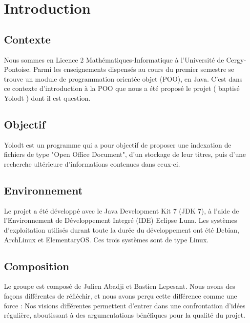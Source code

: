 \section{Introduction} %

\subsection{Contexte}
Nous sommes en Licence 2 Mathématiques-Informatique à l'Université de Cergy-Pontoise. Parmi les enseignements dispensés au cours du premier semestre se trouve un module de programmation orientée objet (POO), en Java. C'est dans ce contexte d'introduction à la POO que nous a été proposé le projet ( baptisé Yolodt ) dont il est question.
\subsection{Objectif}
Yolodt est un programme qui a pour objectif de proposer une indexation de fichiers de type "Open Office Document", d'un stockage de leur titres, puis d'une recherche ultérieure d'informations contenues dans ceux-ci.
\subsection{Environnement}
Le projet a été développé avec le Java Development Kit 7 (JDK 7), à l'aide de l'Environnement de Développement Integré (IDE) Eclipse Luna. 
Les systèmes d'exploitation utilisés durant toute la durée du développement ont été Debian, ArchLinux et ElementaryOS. 
Ces trois systèmes sont de type Linux.
\subsection{Composition}
Le groupe est composé de Julien Abadji et Bastien Lepesant. Nous avons des façons différentes de réfléchir, et nous avons perçu cette différence comme une force :   Nos visions différentes permettent d'entrer dans une confrontation d'idées régulière, aboutissant à des argumentations bénéfiques pour la qualité du projet.
